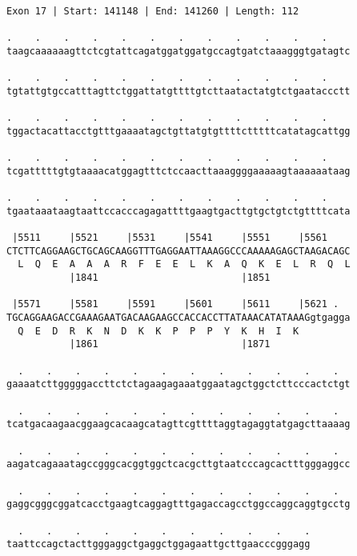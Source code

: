 \documentclass{article}
\begin{document}
\newpage
\begin{Verbatim}
Exon 17 | Start: 141148 | End: 141260 | Length: 112
 
.    .    .    .    .    .    .    .    .    .    .    .    
taagcaaaaaagttctcgtattcagatggatggatgccagtgatctaaagggtgatagtc
  
.    .    .    .    .    .    .    .    .    .    .    .    
tgtattgtgccatttagttctggattatgttttgtcttaatactatgtctgaataccctt
  
.    .    .    .    .    .    .    .    .    .    .    .    
tggactacattacctgtttgaaaatagctgttatgtgttttctttttcatatagcattgg
  
.    .    .    .    .    .    .    .    .    .    .    .    
tcgatttttgtgtaaaacatggagtttctccaacttaaaggggaaaaagtaaaaaataag
  
.    .    .    .    .    .    .    .    .    .    .    .    
tgaataaataagtaattccacccagagattttgaagtgacttgtgctgtctgttttcata
  
 |5511     |5521     |5531     |5541     |5551     |5561    
CTCTTCAGGAAGCTGCAGCAAGGTTTGAGGAATTAAAGGCCCAAAAAGAGCTAAGACAGC
  L  Q  E  A  A  A  R  F  E  E  L  K  A  Q  K  E  L  R  Q  L
           |1841                         |1851              
  
 |5571     |5581     |5591     |5601     |5611     |5621 .  
TGCAGGAAGACCGAAAGAATGACAAGAAGCCACCACCTTATAAACATATAAAGgtgagga
  Q  E  D  R  K  N  D  K  K  P  P  P  Y  K  H  I  K         
           |1861                         |1871              
  
  .    .    .    .    .    .    .    .    .    .    .    .  
gaaaatcttgggggaccttctctagaagagaaatggaatagctggctcttcccactctgt
  
  .    .    .    .    .    .    .    .    .    .    .    .  
tcatgacaagaacggaagcacaagcatagttcgttttaggtagaggtatgagcttaaaag
  
  .    .    .    .    .    .    .    .    .    .    .    .  
aagatcagaaatagccgggcacggtggctcacgcttgtaatcccagcactttgggaggcc
  
  .    .    .    .    .    .    .    .    .    .    .    .  
gaggcgggcggatcacctgaagtcaggagtttgagaccagcctggccaggcaggtgcctg
  
  .    .    .    .    .    .    .    .    .    .    .
taattccagctacttgggaggctgaggctggagaattgcttgaacccgggagg
\end{Verbatim}
\newpage
\end{document}

